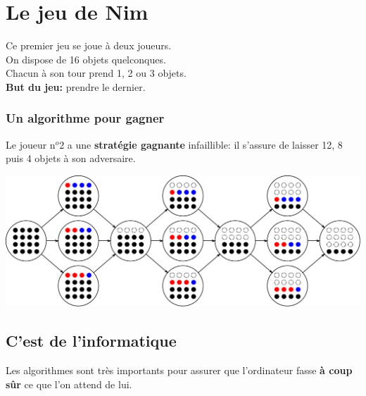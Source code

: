 \documentclass[a7paper,pagesize,DIV=14,10pt]{scrbook}
\begin{document}
\section*{Le jeu de Nim}

\vspace{-.5\baselineskip}
Ce premier jeu se joue à deux joueurs.\\
On dispose de 16 objets quelconques.\\
Chacun à son tour prend 1, 2 ou 3 objets.\\
\textbf{But du jeu:} prendre le dernier.

\vspace{-.5\baselineskip}
\subsubsection*{Un algorithme pour gagner}

\vspace{-.5\baselineskip} %
Le joueur n$^o$2 a une \textbf{stratégie gagnante} infaillible: il
s'assure de laisser 12, 8 puis 4 objets à son adversaire.

\includegraphics[width=\linewidth]{img/nim16.pdf}

\subsection*{C'est de l'informatique}
\vspace{-.5\baselineskip} %
Les algorithmes sont très importants pour assurer que l'ordinateur
fasse \textbf{à coup sûr} ce que l'on attend de lui.

\newpage
\end{document}
